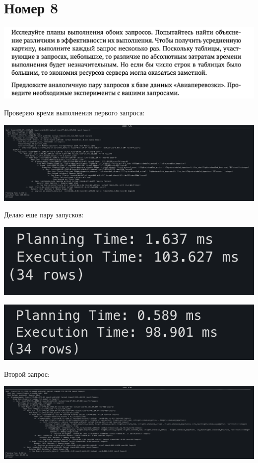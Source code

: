 \documentclass[a4paper,12pt]{article}
\begin{document}
\section*{Номер 8}
\begin{center}
\includegraphics[scale=0.4]{t8.png}
\end{center}
Проверяю время выполнения первого запроса:
\begin{center}
\includegraphics[scale=0.4]{81.png}
\end{center}
Делаю еще пару запусков:
\begin{center}
\includegraphics[scale=0.6]{82.png}
\end{center}
\begin{center}
\includegraphics[scale=0.6]{83.png}
\end{center}
Второй запрос:
\begin{center}
\includegraphics[scale=0.3]{84.png}
\end{center}
\end{document}
